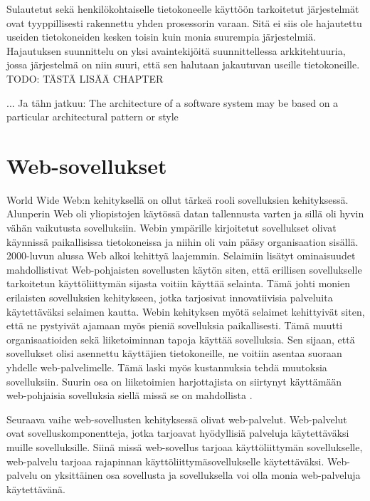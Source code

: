 \documentclass[utf8]{gradu3}
\begin{document}
Sulautetut sekä henkilökohtaiselle tietokoneelle käyttöön tarkoitetut järjestelmät ovat tyyppillisesti rakennettu yhden prosessorin varaan. Sitä ei siis ole hajautettu useiden tietokoneiden kesken toisin kuin monia suurempia järjestelmiä. Hajautuksen suunnittelu on yksi avaintekijöitä suunnittellessa arkkitehtuuria, jossa järjestelmä on niin suuri, että sen halutaan jakautuvan useille tietokoneille. TODO: TÄSTÄ LISÄÄ CHAPTER 


... Ja tähn jatkuu: The architecture of a software system may be based on a particular architectural pattern or style








\chapter{Web-sovellukset}
World Wide Web:n kehityksellä on ollut tärkeä rooli sovelluksien kehityksessä. Alunperin Web oli yliopistojen käytössä datan tallennusta varten ja sillä oli hyvin vähän vaikutusta sovelluksiin. Webin ympärille kirjoitetut sovellukset olivat käynnissä paikallisissa tietokoneissa ja niihin oli vain pääsy organisaation sisällä. 2000-luvun alussa Web alkoi kehittyä laajemmin. Selaimiin lisätyt ominaisuudet mahdollistivat Web-pohjaisten sovellusten käytön siten, että erillisen sovellukselle tarkoitetun käyttöliittymän sijasta voitiin käyttää selainta. Tämä johti monien erilaisten sovelluksien kehitykseen, jotka tarjosivat innovatiivisia palveluita käytettäväksi selaimen kautta. Webin kehityksen myötä selaimet kehittyivät siten, että ne pystyivät ajamaan myös pieniä sovelluksia paikallisesti. Tämä muutti organisaatioiden sekä liiketoiminnan tapoja käyttää sovelluksia. Sen sijaan, että sovellukset olisi asennettu käyttäjien tietokoneille, ne voitiin asentaa suoraan yhdelle web-palvelimelle. Tämä laski myös kustannuksia tehdä muutoksia sovelluksiin. Suurin osa on liiketoimien harjottajista on siirtynyt käyttämään web-pohjaisia sovelluksia siellä missä se on mahdollista \parencite[s.8]{Sommerville}.

Seuraava vaihe web-sovellusten kehityksessä olivat web-palvelut. Web-palvelut ovat sovelluskomponentteja, jotka tarjoavat hyödyllisiä palveluja käytettäväksi muille sovelluksille. Siinä missä web-sovellus tarjoaa käyttöliittymän sovellukselle, web-palvelu tarjoaa rajapinnan käyttöliittymäsovellukselle käytettäväksi. Web-palvelu on yksittäinen osa sovellusta ja sovelluksella voi olla monia web-palveluja käytettävänä. 
\end{document}
